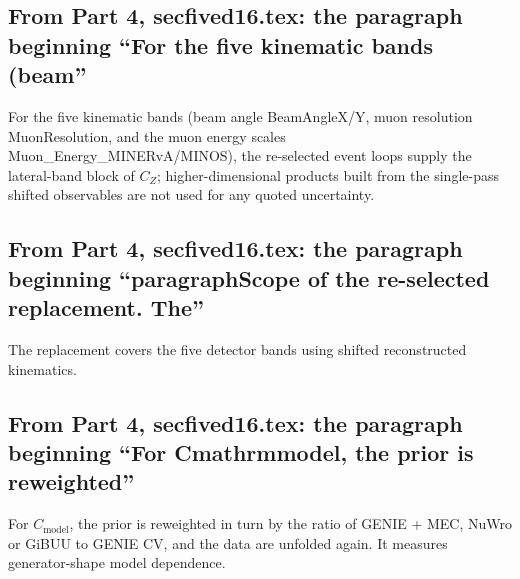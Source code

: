\subsection{From Part 4, secfived16.tex: the paragraph beginning ``For the five kinematic bands (beam''}
For the five kinematic bands (beam angle BeamAngleX/Y, muon resolution MuonResolution, and the muon energy scales Muon\_Energy\_MINERvA/MINOS), the re-selected event loops supply the lateral-band block of $C_Z$; higher-dimensional products built from the single-pass shifted observables are not used for any quoted uncertainty.

\subsection{From Part 4, secfived16.tex: the paragraph beginning ``paragraphScope of the re-selected replacement. The''}
The replacement covers the five detector bands using shifted reconstructed kinematics.

\subsection{From Part 4, secfived16.tex: the paragraph beginning ``For Cmathrmmodel, the prior is reweighted''}
For $C_{\mathrm{model}}$, the prior is reweighted in turn by the ratio of GENIE + MEC, NuWro or GiBUU to GENIE CV, and the data are unfolded again. It measures generator-shape model dependence.

